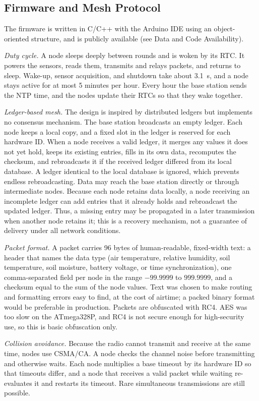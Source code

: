 \subsection{Firmware and Mesh Protocol}
The firmware is written in C/C++ with the Arduino IDE using an object-oriented structure, and is publicly available (see Data and Code Availability).

\textit{Duty cycle.} A node sleeps deeply between rounds and is woken by its RTC. It powers the sensors, reads them, transmits and relays packets, and returns to sleep. Wake-up, sensor acquisition, and shutdown take about 3.1~s, and a node stays active for at most 5 minutes per hour. Every hour the base station sends the NTP time, and the nodes update their RTCs so that they wake together.

\textit{Ledger-based mesh.} The design is inspired by distributed ledgers but implements no consensus mechanism. The base station broadcasts an empty ledger. Each node keeps a local copy, and a fixed slot in the ledger is reserved for each hardware ID. When a node receives a valid ledger, it merges any values it does not yet hold, keeps its existing entries, fills in its own data, recomputes the checksum, and rebroadcasts it if the received ledger differed from its local database. A ledger identical to the local database is ignored, which prevents endless rebroadcasting. Data may reach the base station directly or through intermediate nodes. Because each node retains data locally, a node receiving an incomplete ledger can add entries that it already holds and rebroadcast the updated ledger. Thus, a missing entry may be propagated in a later transmission when another node retains it; this is a recovery mechanism, not a guarantee of delivery under all network conditions.

\textit{Packet format.} A packet carries 96 bytes of human-readable, fixed-width text: a header that names the data type (air temperature, relative humidity, soil temperature, soil moisture, battery voltage, or time synchronization), one comma-separated field per node in the range $-99.9999$ to $999.9999$, and a checksum equal to the sum of the node values. Text was chosen to make routing and formatting errors easy to find, at the cost of airtime; a packed binary format would be preferable in production. Packets are obfuscated with RC4. AES was too slow on the ATmega328P, and RC4 is not secure enough for high-security use, so this is basic obfuscation only.

\textit{Collision avoidance.} Because the radio cannot transmit and receive at the same time, nodes use CSMA/CA. A node checks the channel noise before transmitting and otherwise waits. Each node multiplies a base timeout by its hardware ID so that timeouts differ, and a node that receives a valid packet while waiting re-evaluates it and restarts its timeout. Rare simultaneous transmissions are still possible.

